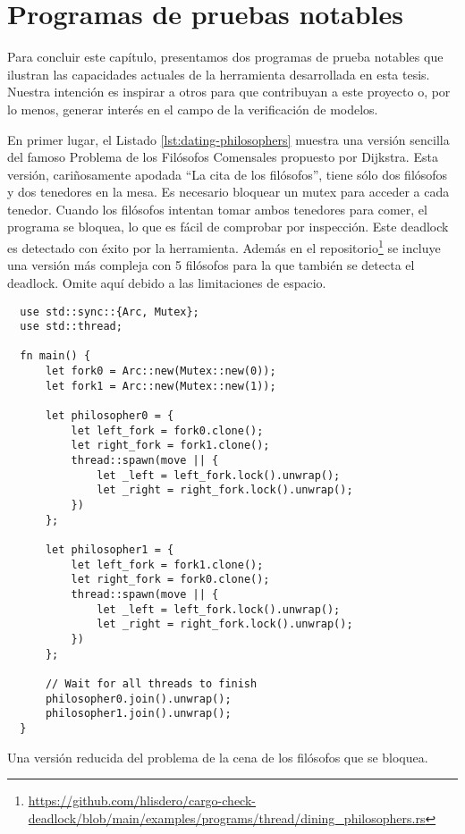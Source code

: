 \section{Programas de pruebas notables}

Para concluir este capítulo, presentamos dos programas de prueba notables que ilustran las
capacidades actuales de la herramienta desarrollada en esta tesis.
Nuestra intención es inspirar a otros para que contribuyan a este proyecto o, por lo menos,
generar interés en el campo de la verificación de modelos.

En primer lugar, el Listado \ref{lst:dating-philosophers} muestra
una versión sencilla del famoso Problema de los Filósofos Comensales propuesto por Dijkstra.
Esta versión, cariñosamente apodada ``La cita de los filósofos'',
tiene sólo dos filósofos y dos tenedores en la mesa. Es necesario bloquear un mutex
para acceder a cada tenedor. Cuando los filósofos intentan tomar ambos tenedores para comer,
el programa se bloquea, lo que es fácil de comprobar por inspección. Este deadlock es
detectado con éxito por la herramienta.
Además en el repositorio\footnote{\url{https://github.com/hlisdero/cargo-check-deadlock/blob/main/examples/programs/thread/dining\_philosophers.rs}}
se incluye una versión más
compleja con 5 filósofos para la que también se detecta el deadlock.
Omite aquí debido a las limitaciones de espacio.

\begin{listing}[!htbp]
    \begin{verbatim}
  use std::sync::{Arc, Mutex};
  use std::thread;
    
  fn main() {
      let fork0 = Arc::new(Mutex::new(0));
      let fork1 = Arc::new(Mutex::new(1));
    
      let philosopher0 = {
          let left_fork = fork0.clone();
          let right_fork = fork1.clone();
          thread::spawn(move || {
              let _left = left_fork.lock().unwrap();
              let _right = right_fork.lock().unwrap();
          })
      };
    
      let philosopher1 = {
          let left_fork = fork1.clone();
          let right_fork = fork0.clone();
          thread::spawn(move || {
              let _left = left_fork.lock().unwrap();
              let _right = right_fork.lock().unwrap();
          })
      };
    
      // Wait for all threads to finish
      philosopher0.join().unwrap();
      philosopher1.join().unwrap();
  }    
  \end{verbatim}
    \caption{Una versión reducida del problema de la cena de los filósofos que se bloquea.}
    \label{lst:dating-philosophers}
\end{listing}

